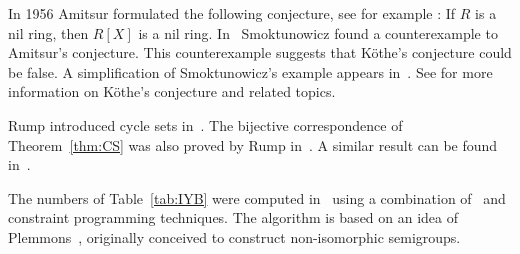 In 1956 Amitsur formulated the following conjecture, see for example
\cite{MR0347873}: If $R$ is a nil ring, then $R[X]$ is a nil ring. In~\cite{MR1793911} 
Smoktunowicz found a counterexample to Amitsur's conjecture. 
This counterexample suggests that K\"othe's conjecture could be false. 
A simplification of Smoktunowicz's example
appears in~\cite{MR3169522}. See \cite{MR1879880,MR2275597} for more
information on K\"othe's conjecture and related topics. 


Rump introduced cycle sets in~\cite{MR2132760}. The bijective correspondence of 
Theorem~\ref{thm:CS} was 
also proved by Rump in~\cite{MR2132760}. A similar result can be 
found in~\cite[Proposition 2.2]{MR1722951}. 

The numbers of Table~\ref{tab:IYB} were computed in~\cite{AMV}
using a combination of~\cite{GAP4} and constraint programming techniques. 
The algorithm is based on an idea of Plemmons~\cite{MR0258994}, originally 
conceived to construct non-isomorphic semigroups.  

